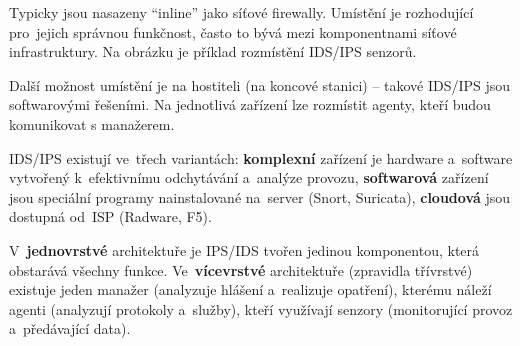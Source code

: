 Typicky jsou nasazeny \enquote{inline} jako síťové firewally. Umístění je rozhodující pro~jejich správnou funkčnost, často to bývá mezi komponentnami síťové infrastruktury. Na obrázku je příklad rozmístění IDS/IPS senzorů.

\begin{figure}[ht]
    \centering
\end{figure}

Další možnost umístění je na hostiteli (na koncové stanici) -- takové IDS/IPS jsou softwarovými řešeními. Na jednotlivá zařízení lze rozmístit agenty, kteří budou komunikovat s manažerem.

IDS/IPS existují ve~třech variantách: \textbf{komplexní} zařízení je hardware a~software vytvořený k~efektivnímu odchytávání a~analýze provozu, \textbf{softwarová} zařízení jsou speciální programy nainstalované na~server (Snort, Suricata), \textbf{cloudová} jsou dostupná od~ISP (Radware, F5).

V~\textbf{jednovrstvé} architektuře je IPS/IDS tvořen jedinou komponentou, která obstarává všechny funkce. Ve~\textbf{vícevrstvé} architektuře (zpravidla třívrstvé) existuje jeden manažer (analyzuje hlášení a~realizuje opatření), kterému náleží agenti (analyzují protokoly a~služby), kteří využívají senzory (monitorující provoz a~předávající data).

